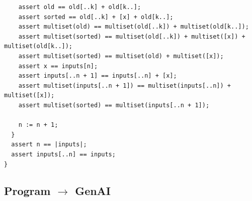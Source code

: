 \documentclass{article}
\begin{document}
\begin{lstlisting}
    assert old == old[..k] + old[k..];
    assert sorted == old[..k] + [x] + old[k..];
    assert multiset(old) == multiset(old[..k]) + multiset(old[k..]);
    assert multiset(sorted) == multiset(old[..k]) + multiset([x]) + multiset(old[k..]);
    assert multiset(sorted) == multiset(old) + multiset([x]);
    assert x == inputs[n];
    assert inputs[..n + 1] == inputs[..n] + [x];
    assert multiset(inputs[..n + 1]) == multiset(inputs[..n]) + multiset([x]);
    assert multiset(sorted) == multiset(inputs[..n + 1]);

    n := n + 1;
  }
  assert n == |inputs|;
  assert inputs[..n] == inputs;
}
\end{lstlisting}
\subsection*{Program $\rightarrow$ GenAI}
\end{document}
